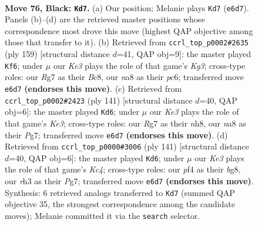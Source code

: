 \documentclass[11pt]{article}
\begin{document}
\clearpage

\begin{figure}[p]\centering
\begin{subfigure}{0.46\textwidth}\centering
\resizebox{\linewidth}{!}{%
\newchessgame
\chessboard[
  setfen={N7/p5r1/P1p1k1p1/2P2p1p/bP3P1P/7R/5K2/8 b - - 8 76},
  showmover=false,
  pgfstyle=straightmove, color=movearrow, markmove={e6-d7}
]}
\caption{}
\end{subfigure}\hfill
\begin{subfigure}{0.46\textwidth}\centering
\resizebox{\linewidth}{!}{%
\newchessgame
\chessboard[
  setfen={2b5/8/2P1p1k1/1p1p1p2/1P1P1P2/pB2P2P/8/7K b - - 17 80},
  showmover=false,
  pgfstyle=straightmove, color=movearrow, markmove={g6-f6}
]}
\caption{}
\end{subfigure}
\\[4pt]
\begin{subfigure}{0.46\textwidth}\centering
\resizebox{\linewidth}{!}{%
\newchessgame
\chessboard[
  setfen={7N/6p1/2p1kp2/p3p1pP/Pb2P1P1/3K1P2/8/8 b - - 10 71},
  showmover=false,
  pgfstyle=straightmove, color=movearrow, markmove={e6-d6}
]}
\caption{}
\end{subfigure}\hfill
\begin{subfigure}{0.46\textwidth}\centering
\resizebox{\linewidth}{!}{%
\newchessgame
\chessboard[
  setfen={6B1/6p1/2p2p1p/p1k4P/P3PbP1/2P5/2K5/8 b - - 71 71},
  showmover=false,
  pgfstyle=straightmove, color=movearrow, markmove={c5-d6}
]}
\caption{}
\end{subfigure}
\caption{\textbf{Move 76, Black: \texttt{Kd7}.} (a) Our position; Melanie plays \texttt{Kd7} (\texttt{e6d7}). Panels (b)--(d) are the retrieved master positions whose correspondence most drove this move (highest QAP objective among those that transfer to it). (b) Retrieved from \texttt{ccrl\_top\_p0002\#2635} (ply 159) [structural distance $d$=41, QAP obj=9]: the master played \texttt{Kf6}; under $\mu$ our \emph{Ke3} plays the role of that game's \emph{Kg3}; cross-type roles: our \emph{R}g7 as their \emph{B}c8, our \emph{n}a8 as their \emph{p}c6; transferred move \texttt{e6d7} \textbf{(endorses this move)}. (c) Retrieved from \texttt{ccrl\_top\_p0002\#2423} (ply 141) [structural distance $d$=40, QAP obj=6]: the master played \texttt{Kd6}; under $\mu$ our \emph{Ke3} plays the role of that game's \emph{Ke3}; cross-type roles: our \emph{R}g7 as their \emph{n}h8, our \emph{n}a8 as their \emph{P}g7; transferred move \texttt{e6d7} \textbf{(endorses this move)}. (d) Retrieved from \texttt{ccrl\_top\_p0000\#3006} (ply 141) [structural distance $d$=40, QAP obj=6]: the master played \texttt{Kd6}; under $\mu$ our \emph{Ke3} plays the role of that game's \emph{Kc4}; cross-type roles: our \emph{p}f4 as their \emph{b}g8, our \emph{r}h3 as their \emph{P}g7; transferred move \texttt{e6d7} \textbf{(endorses this move)}. Synthesis: 6 retrieved analogs transferred to \texttt{Kd7} (summed QAP objective 35, the strongest correspondence among the candidate moves); Melanie committed it via the \texttt{search} selector.}
\label{fig:thought-m151}
\end{figure}
\end{document}
